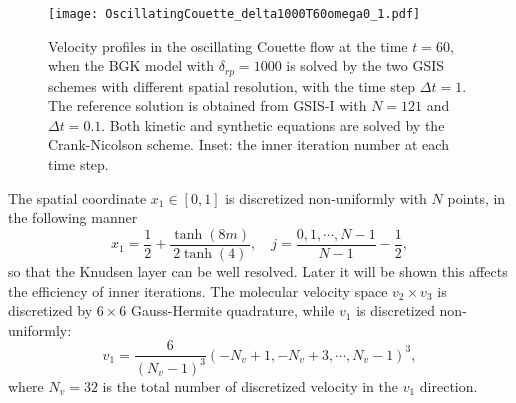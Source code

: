 \documentclass[onefignum,onetabnum]{siamart171218}
\begin{document}

\begin{figure}[t]
	\centering
	\texttt{[image: OscillatingCouette\_delta1000T60omega0\_1.pdf]}
	\caption{
		Velocity profiles in the oscillating Couette flow at the time $t=60$, when the BGK model with $\delta_{rp}=1000$ is solved by the two GSIS schemes with different spatial resolution, with the time step $\Delta{t}=1$. The reference solution is obtained from GSIS-I with $N=121$ and $\Delta{t}=0.1$. Both kinetic and synthetic equations are solved by the Crank-Nicolson scheme. Inset: the inner iteration number at each time step.  
	}
	\label{fig:Couette}
\end{figure}


The spatial coordinate $x_1\in[0,1]$ is discretized non-uniformly with $N$ points, in the following manner
\begin{equation}\label{spatial_discretization}
x_1=\frac{1}{2}+\frac{\tanh(8m)}{2\tanh(4)}, \quad
j=\frac{0,1,\cdots,N-1}{N-1}-\frac{1}{2},
\end{equation}
so that the Knudsen layer can be well resolved. Later it will be shown this affects the efficiency of inner iterations.  The molecular velocity space $v_2\times{v_3}$ is discretized by $6\times6$ Gauss-Hermite quadrature, while $v_1$ is discretized non-uniformly:
\begin{equation}\label{nonuniform_v}
v_1=\frac{6}{(N_v-1)^3}(-N_v+1,-N_v+3,\cdots,{N_v-1})^3,
\end{equation}
where $N_v=32$ is the total number of discretized velocity in the $v_1$ direction. 
\end{document}
